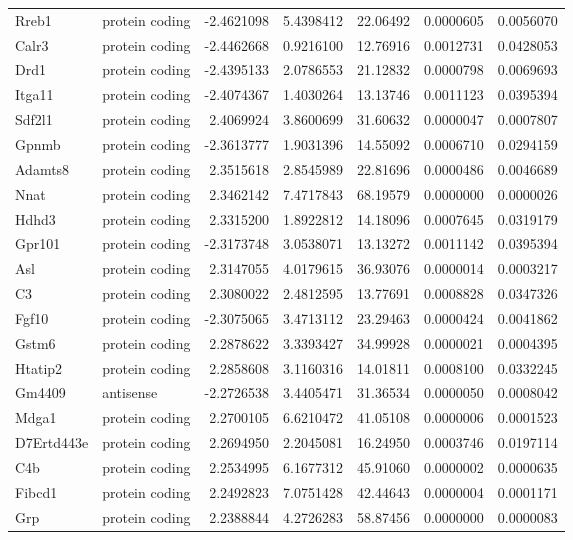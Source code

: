 \documentclass[onehalf,12pt]{beavtex}
\begin{document}
\begin{longtable}{llrrrrr}
  Rreb1 & protein coding & -2.4621098 & 5.4398412 & 22.06492 & 0.0000605 & 0.0056070\\
  Calr3 & protein coding & -2.4462668 & 0.9216100 & 12.76916 & 0.0012731 & 0.0428053\\
  \addlinespace
  Drd1 & protein coding & -2.4395133 & 2.0786553 & 21.12832 & 0.0000798 & 0.0069693\\
  Itga11 & protein coding & -2.4074367 & 1.4030264 & 13.13746 & 0.0011123 & 0.0395394\\
  Sdf2l1 & protein coding & 2.4069924 & 3.8600699 & 31.60632 & 0.0000047 & 0.0007807\\
  Gpnmb & protein coding & -2.3613777 & 1.9031396 & 14.55092 & 0.0006710 & 0.0294159\\
  Adamts8 & protein coding & 2.3515618 & 2.8545989 & 22.81696 & 0.0000486 & 0.0046689\\
  \addlinespace
  Nnat & protein coding & 2.3462142 & 7.4717843 & 68.19579 & 0.0000000 & 0.0000026\\
  Hdhd3 & protein coding & 2.3315200 & 1.8922812 & 14.18096 & 0.0007645 & 0.0319179\\
  Gpr101 & protein coding & -2.3173748 & 3.0538071 & 13.13272 & 0.0011142 & 0.0395394\\
  Asl & protein coding & 2.3147055 & 4.0179615 & 36.93076 & 0.0000014 & 0.0003217\\
  C3 & protein coding & 2.3080022 & 2.4812595 & 13.77691 & 0.0008828 & 0.0347326\\
  \addlinespace
  Fgf10 & protein coding & -2.3075065 & 3.4713112 & 23.29463 & 0.0000424 & 0.0041862\\
  Gstm6 & protein coding & 2.2878622 & 3.3393427 & 34.99928 & 0.0000021 & 0.0004395\\
  Htatip2 & protein coding & 2.2858608 & 3.1160316 & 14.01811 & 0.0008100 & 0.0332245\\
  Gm4409 & antisense & -2.2726538 & 3.4405471 & 31.36534 & 0.0000050 & 0.0008042\\
  Mdga1 & protein coding & 2.2700105 & 6.6210472 & 41.05108 & 0.0000006 & 0.0001523\\
  \addlinespace
  D7Ertd443e & protein coding & 2.2694950 & 2.2045081 & 16.24950 & 0.0003746 & 0.0197114\\
  C4b & protein coding & 2.2534995 & 6.1677312 & 45.91060 & 0.0000002 & 0.0000635\\
  Fibcd1 & protein coding & 2.2492823 & 7.0751428 & 42.44643 & 0.0000004 & 0.0001171\\
  Grp & protein coding & 2.2388844 & 4.2726283 & 58.87456 & 0.0000000 & 0.0000083\\

\end{longtable}
\end{document}
